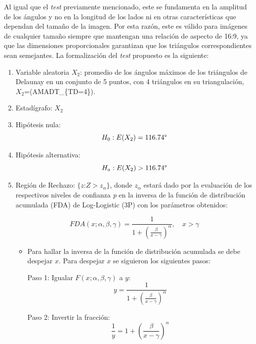\documentclass[12pt]{report}
\begin{document}
Al igual que el \textit{test} previamente mencionado, este se fundamenta en la amplitud de los ángulos y no en la longitud de los lados ni en otras características que dependan del tamaño de la imagen. Por esta razón, este es válido para imágenes de cualquier tamaño siempre que mantengan una relación de aspecto de 16:9, ya que las dimensiones proporcionales garantizan que los triángulos correspondientes sean semejantes. La formalización del \textit{test} propuesto es la siguiente:
\begin{enumerate}
	\item Variable aleatoria $X_2$: promedio de los ángulos máximos de los triángulos de Delaunay en un conjunto de 5 puntos, con 4 triángulos en su triangulación, $X_2$=(AMADT\_\{TD=4\}).
	\item Estadígrafo: $X_2$
	
	\item Hipótesis nula: \[H_0:E(X_2)=116.74\degree\]
	
	
	\item Hipótesis alternativa: \[H_a:E(X_2)>116.74\degree\]
	
	\item  Región de Rechazo: $\{z$:$Z>z_\alpha\}$, donde  $z_\alpha$ estará dado por la evaluación de los respectivos niveles de confianza \textit{p} en la  inversa de la función de distribución acumulada (FDA) de Log-Logistic (3P) con los parámetros obtenidos: 
	
	\[
	FDA(x; \alpha, \beta, \gamma) = \frac{1}{1 + \left( \frac{\beta}{x - \gamma} \right)^\alpha}, \quad x > \gamma
	\]
	\begin{itemize}
		\item  Para hallar la inversa de la función de distribución acumulada se debe despejar $x$. Para despejar \( x \)  se siguieron los siguientes pasos:
		
		Paso 1: Igualar \( F(x; \alpha, \beta, \gamma) \) a \( y \):
		\[
		y = \frac{1}{1 + \left( \frac{\beta}{x - \gamma} \right)^\alpha}
		\]
		
		Paso 2: Invertir la fracción:
		\[
		\frac{1}{y} = 1 + \left( \frac{\beta}{x - \gamma} \right)^\alpha
		\]
		

\end{itemize}
\end{enumerate}
\end{document}
